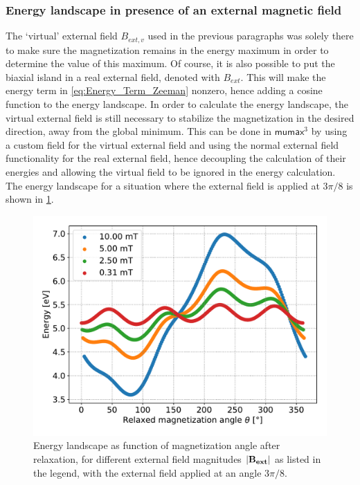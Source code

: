 \documentclass[12pt,a4paper]{article}
\newcommand{\mumax}{$\mathsf{mumax}^3$}
\begin{document}
\subsubsection{Energy landscape in presence of an external magnetic field}
The `virtual' external field $B_{ext,v}$ used in the previous paragraphs was solely there to make sure the magnetization remains in the energy maximum in order to determine the value of this maximum. Of course, it is also possible to put the biaxial island in a real external field, denoted with $B_{ext}$. This will make the energy term in \cref{eq:Energy_Term_Zeeman} nonzero, hence adding a cosine function to the energy landscape. In order to calculate the energy landscape, the virtual external field is still necessary to stabilize the magnetization in the desired direction, away from the global minimum. This can be done in \mumax{} by using a custom field for the virtual external field and using the normal external field functionality for the real external field, hence decoupling the calculation of their energies and allowing the virtual field to be ignored in the energy calculation. The energy landscape for a situation where the external field is applied at $3\pi/8$ is shown in \cref{fig:barrierLandscape_extField}.
\begin{figure}
    \centering
    \includegraphics[width=0.9\columnwidth]{Figures/biaxial_island/BarrierLandscape/Ext_K0.1Ms2_Bext1e-2-1e-4_a3Pi8.pdf}
    \caption{Energy landscape as function of magnetization angle after relaxation, for different external field magnitudes $\abs{\vb{B_{ext}}}$ as listed in the legend, with the external field applied at an angle $3\pi/8$.}
    \label{fig:barrierLandscape_extField}
\end{figure}
\end{document}
